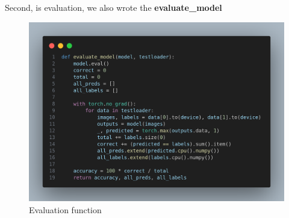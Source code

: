 \documentclass[a4paper,12pt]{article}
\begin{document}
Second, is evaluation, we also wrote the \textbf{evaluate\_model}

\begin{figure}[h]
    \centering
    \includegraphics[width=0.7\linewidth]{images/evaluation_func.png}
    \caption{Evaluation function}
    \label{fig:enter-label}
\end{figure}
\end{document}
